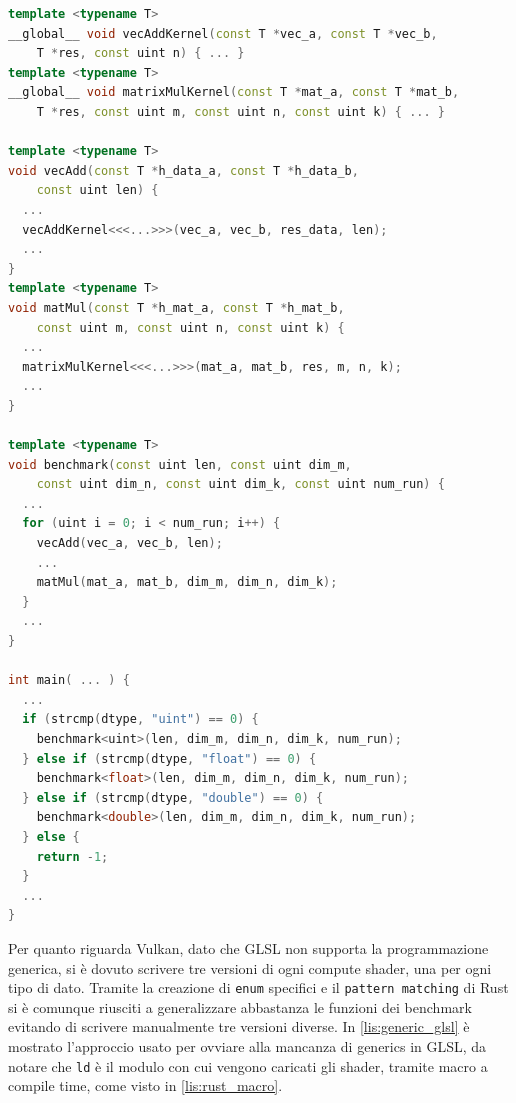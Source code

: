 \vspace{5mm}
\begin{lstlisting}[language=C++, caption=Programmazione generica in CUDA, label=lis:generic_cuda]
template <typename T>
__global__ void vecAddKernel(const T *vec_a, const T *vec_b, 
    T *res, const uint n) { ... }
template <typename T>
__global__ void matrixMulKernel(const T *mat_a, const T *mat_b, 
    T *res, const uint m, const uint n, const uint k) { ... }

template <typename T>
void vecAdd(const T *h_data_a, const T *h_data_b, 
    const uint len) { 
  ...
  vecAddKernel<<<...>>>(vec_a, vec_b, res_data, len);
  ...
}
template <typename T>
void matMul(const T *h_mat_a, const T *h_mat_b, 
    const uint m, const uint n, const uint k) { 
  ... 
  matrixMulKernel<<<...>>>(mat_a, mat_b, res, m, n, k);
  ...
}

template <typename T>
void benchmark(const uint len, const uint dim_m, 
    const uint dim_n, const uint dim_k, const uint num_run) {
  ...
  for (uint i = 0; i < num_run; i++) {
    vecAdd(vec_a, vec_b, len);
    ...
    matMul(mat_a, mat_b, dim_m, dim_n, dim_k);
  }
  ...
}

int main( ... ) {
  ...
  if (strcmp(dtype, "uint") == 0) {
    benchmark<uint>(len, dim_m, dim_n, dim_k, num_run);
  } else if (strcmp(dtype, "float") == 0) {
    benchmark<float>(len, dim_m, dim_n, dim_k, num_run);
  } else if (strcmp(dtype, "double") == 0) {
    benchmark<double>(len, dim_m, dim_n, dim_k, num_run);
  } else {
    return -1;
  }
  ...
}
\end{lstlisting}
\vspace{5mm}

Per quanto riguarda Vulkan, dato che GLSL non supporta la programmazione generica, si è dovuto scrivere tre versioni di ogni compute shader, una per ogni tipo di dato. Tramite la creazione di \verb|enum| specifici e il \verb|pattern matching| di Rust si è comunque riusciti a generalizzare abbastanza le funzioni dei benchmark evitando di scrivere manualmente tre versioni diverse. In \ref{lis:generic_glsl} è mostrato l'approccio usato per ovviare alla mancanza di generics in GLSL, da notare che \verb|ld| è il modulo con cui vengono caricati gli shader, tramite macro a compile time, come visto in \ref{lis:rust_macro}.

